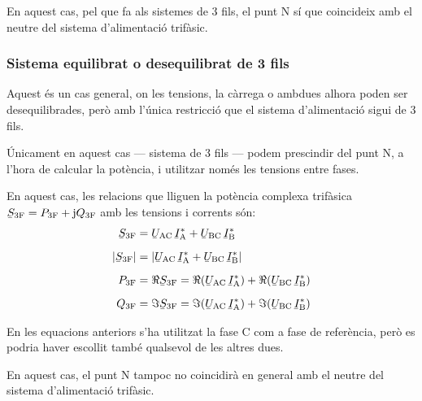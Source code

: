 En aquest cas, pel que fa als sistemes de 3 fils,  el punt N sí
que coincideix amb el neutre del sistema d'alimentació trifàsic.

\subsubsection{Sistema equilibrat o desequilibrat de 3 fils}

Aquest és un cas  general, on les tensions, la càrrega o ambdues alhora  poden ser desequilibrades, però amb l'única restricció que
el sistema d'alimentació sigui de 3 fils.

 Únicament en aquest cas --- sistema de 3 fils --- podem prescindir del punt N, a l'hora de
calcular la potència, i utilitzar només les tensions entre fases.

En aquest cas, les relacions que lliguen la potència complexa
trifàsica $\cmplx{S}\ped{3F} = P\ped{3F} + \ju Q\ped{3F}$ amb les
tensions i corrents són:
\begin{align}
    \cmplx{S}\ped{3F} &= \cmplx{U}\ped{AC} \,\cmplx{I}\ped{A}^*
     +  \cmplx{U}\ped{BC} \,\cmplx{I}\ped{B}^*  \label{eq:s_3f_3fils}\\[2mm]
    |\cmplx{S}\ped{3F}| &= |\cmplx{U}\ped{AC}\, \cmplx{I}\ped{A}^* +
    \cmplx{U}\ped{BC}\, \cmplx{I}\ped{B}^*| \\[2mm]
    P\ped{3F} &= \Re\cmplx{S}\ped{3F}= \Re(\cmplx{U}\ped{AC}\, \cmplx{I}\ped{A}^*) +
    \Re(\cmplx{U}\ped{BC}\, \cmplx{I}\ped{B}^*) \\[2mm]
    Q\ped{3F} &= \Im\cmplx{S}\ped{3F}=\Im(\cmplx{U}\ped{AC} \,\cmplx{I}\ped{A}^*) +
    \Im(\cmplx{U}\ped{BC} \,\cmplx{I}\ped{B}^*)
\end{align}

En les equacions anteriors s'ha utilitzat la fase C com a
fase de referència, però es podria haver escollit també qualsevol de
les altres dues.

En aquest cas, el punt N tampoc no coincidirà en general amb
el neutre del sistema d'alimentació trifàsic.

